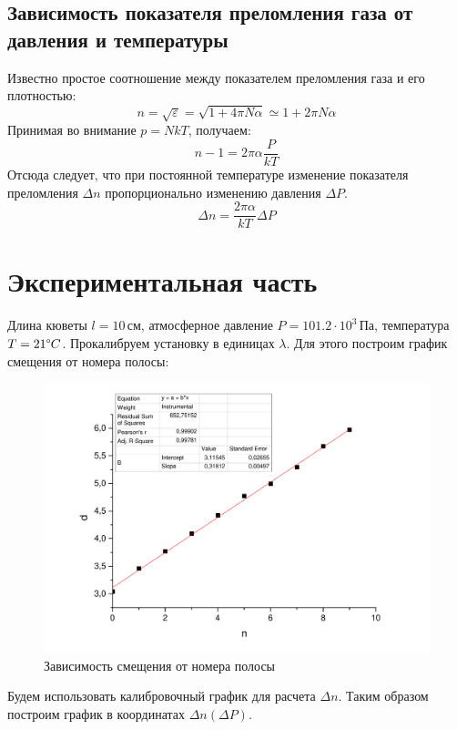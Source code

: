 \documentclass[a4paper,12pt]{article}
\begin{document}
	\subsection{Зависимость показателя преломления газа от давления и температуры}
	Известно простое соотношение между показателем преломления газа и его плотностью:
	\begin{equation}
	n = \sqrt{\varepsilon} = \sqrt{1+4\pi N\alpha} \simeq 1 + 2\pi N \alpha
	\end{equation}
	Принимая во внимание $p = NkT$, получаем:
	\begin{equation}
	n - 1 = 2\pi\alpha\frac{P}{kT}
	\end{equation}
	Отсюда следует, что при постоянной температуре изменение показателя преломления $\Delta n$ пропорционально изменению давления $\Delta P$.
	\begin{equation}
	\Delta n = \frac{2\pi\alpha}{kT}\Delta P
	\end{equation}
	
	\section{Экспериментальная часть}
	Длина кюветы $l = 10 \,\text{см}$, атмосферное давление $P = 101.2\cdot 10^3\,\text{Па}$, температура $T = 21 \degree C$. Прокалибруем установку в единицах $\lambda$. Для этого построим график смещения от номера полосы:
	
	\begin{figure}[h!]
		\begin{center}
			\includegraphics[width = \linewidth]{dn}
			\caption{Зависимость смещения от номера полосы}
		\end{center}
	\end{figure}
	\newpage
	Будем использовать калибровочный график для расчета $\Delta n$. Таким образом построим график в координатах $\Delta n\left(\Delta P\right)$.
	
\end{document}

